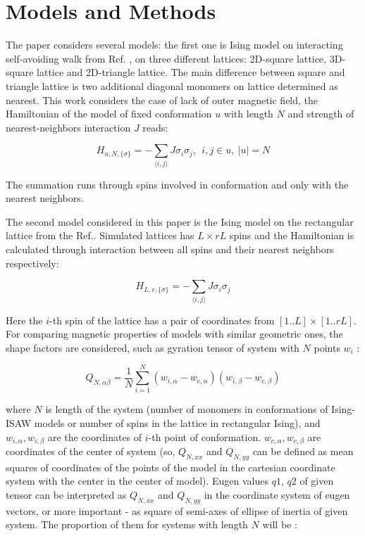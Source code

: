 \section{Models and Methods}


The paper considers several models: the first one is Ising model on interacting self-avoiding walk from Ref. \cite{faizullina2021critical}, on three different lattices: 2D-square lattice, 3D-square lattice and 2D-triangle lattice. The main difference between square and triangle lattice is two additional diagonal monomers on lattice determined as nearest. This work considers the case of lack of outer magnetic field, the Hamiltonian of the model of fixed conformation $u$ with length $N$ and strength of nearest-neighbors interaction $J$ reads:

\begin{equation}\label{H_Ising_ISAW}
  H_{u, N, \{\sigma\}} = - \sum_{\langle i,j \rangle} J  \sigma_{i}  \sigma_{j},\ \ i,j \in u,\ |u| = N
\end{equation}

The summation runs through spins involved in conformation and only with the nearest neighbors. 

The second model considered in this paper is the Ising model on the rectangular lattice from the Ref.\cite{Selke2006}. Simulated lattices has $L \times rL$ spins and the Hamiltonian is calculated through interaction between all spins and their nearest neighbors respectively:

\begin{equation}\label{H_Ising_Rectan}
  H_{L, r, \{\sigma\}} = - \sum_{\langle i,j \rangle} J  \sigma_{i}  \sigma_{j}
\end{equation}

Here the $i$-th spin of the lattice has a pair of coordinates from $[1..L] \times [1..rL]$. For comparing magnetic properties of models with similar geometric ones, the shape factors are considered, such as gyration tensor of system with $N$ points $w_{i}$ \cite{Caracciolo2011}:

\begin{equation}\label{eq:Ten_G1}
    Q_{N,\alpha\beta} = \frac{1}{N} \sum^{N}_{i=1}(w_{i,\alpha} - w_{c, \alpha})(w_{i,\beta} - w_{c, \beta})
\end{equation}

where $N$ is length of the system (number of monomers in conformations of Ising-ISAW models or number of spins in the lattice in rectangular Ising), and  $w_{i, \alpha},w_{i, \beta}$ are the coordinates of $i$-th point of conformation. $w_{c, \alpha},w_{c, \beta}$ are coordinates of the center of system (so, $Q_{N, xx}$ and $Q_{N,yy}$ can be defined as mean squares of coordinates of the points of the model in the cartesian coordinate system with the center in the center of model). Eugen values $q1$, $q2$ of given tensor can be interpreted as $Q_{N, xx}$ and $Q_{N,yy}$ in the coordinate system of eugen vectors, or more important - as square of semi-axes of ellipse of inertia of given system. The proportion of them for systems with length $N$ will be \cite{Caracciolo2011}: 

